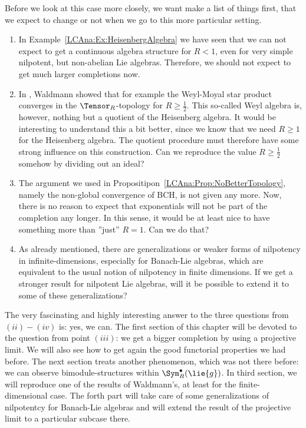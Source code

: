 Before we look at this case more closely, we want make a list of things first, 
that we expect to change or not when we go to this more particular setting.
\begin{enumerate}
	\item
	In Example~\ref{LCAna:Ex:HeisenbergAlgebra} we have seen that we can not 
	expect to get a continuous algebra structure for $R < 1$, even for very 
	simple nilpotent, but non-abelian Lie algebras. Therefore, we should not 
	expect to get much larger completions now.
	
	\item
	In \cite{waldmann:2014a}, Waldmann showed that for example the Weyl-Moyal 
	star product converges in the $\Tensor_R$-topology for $R \geq \frac{1}{2}$. 
	This so-called 	Weyl algebra is, however, nothing but a quotient of the 
	Heisenberg 	algebra. It would be interesting to understand this a bit better, 
	since we know that we need $R \geq 1$ for the Heisenberg algebra. The quotient 
	procedure must 
	therefore have some strong influence on this construction. Can we 
	reproduce the value $R \geq \frac{1}{2}$ somehow by dividing out an ideal?
	
	\item
	The argument we used in Propositipon~\ref{LCAna:Prop:NoBetterTopology},
	namely the non-global convergence of BCH, is not given any more. Now, there is 
	no reason to expect that exponentials will not be part 
	of the completion any longer. In this sense, it would be at least nice to have 
	something more than ''just'' $R = 1$. Can we do that?
	
	\item
	As already mentioned, there are generalizations or weaker forms of 
	nilpotency in infinite-dimensions, especially for Banach-Lie algebras, 
	which are equivalent to the usual notion of nilpotency in finite 
	dimensions. If we get a stronger result for nilpotent Lie algebras, will it be 
	possible to extend it to some of these generalizations?
\end{enumerate}
The very fascinating and highly interesting answer to the three questions from 
$(ii) - (iv)$ is: yes, we can. The first section of this chapter will be devoted 
to the question from point $(iii)$: we get a bigger completion by using a 
projective limit. We will also see how to get again the good functorial 
properties we had before. The next section treats another phenomenon, which was 
not there before: we can observe bimodule-structures within $\Sym_R^{\bullet}
(\lie{g})$. In third section, we will reproduce one of the results of 
Waldmann's, at least for the finite-dimensional case. The forth part will take 
care of some generalizations of nilpotentcy for Banach-Lie algebras and will 
extend the result of the projective limit to a particular subcase there.



